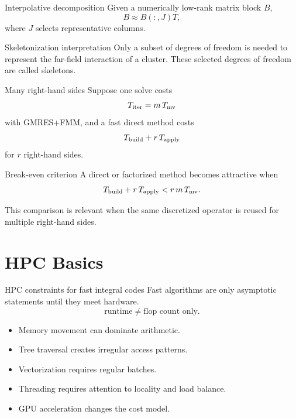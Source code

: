 \documentclass[aspectratio=169,11pt]{beamer}
\begin{document}
\begin{frame}{Interpolative decomposition}
\small
Given a numerically low-rank matrix block $B$,
\[
  B\approx B(:,J)T,
\]
where $J$ selects representative columns.

\begin{block}{Skeletonization interpretation}
Only a subset of degrees of freedom is needed to represent the far-field
interaction of a cluster. These selected degrees of freedom are called
skeletons.
\end{block}
\end{frame}

\begin{frame}{Many right-hand sides}
\small
Suppose one solve costs
\[
T_{\rm iter}=m\,T_{\rm mv}
\]
with GMRES+FMM, and a fast direct method costs
\[
T_{\rm build}+r\,T_{\rm apply}
\]
for $r$ right-hand sides.

\begin{block}{Break-even criterion}
A direct or factorized method becomes attractive when
\[
T_{\rm build}+r\,T_{\rm apply}
<
r\,m\,T_{\rm mv}.
\]
\end{block}

This comparison is relevant when the same discretized operator is reused for
multiple right-hand sides.
\end{frame}

\section{HPC Basics}

\begin{frame}{HPC constraints for fast integral codes}
\small
Fast algorithms are only asymptotic statements until they meet hardware.
\[
  \text{runtime}
  \ne
  \text{flop count only}.
\]

\begin{itemize}
  \item Memory movement can dominate arithmetic.
  \item Tree traversal creates irregular access patterns.
  \item Vectorization requires regular batches.
  \item Threading requires attention to locality and load balance.
  \item GPU acceleration changes the cost model.
\end{itemize}
\end{frame}
\end{document}
